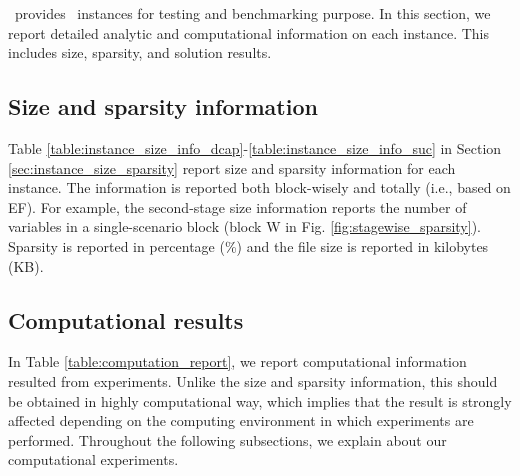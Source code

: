 %
%

\siplibtwo\ provides \smps\ instances for testing and benchmarking purpose. In this section, we report detailed analytic and computational information on each instance. This includes size, sparsity, and solution results.

\subsection{Size and sparsity information}
Table \ref{table:instance_size_info_dcap}-\ref{table:instance_size_info_suc} in Section \ref{sec:instance_size_sparsity} report size and sparsity information for each instance. The information is reported both block-wisely and totally (i.e., based on EF). For example, the second-stage size information reports the number of variables in a single-scenario block (block W in Fig. \ref{fig:stagewise_sparsity}). Sparsity is reported in percentage (\%) and the file size is reported in kilobytes (KB).

\subsection{Computational results}
In Table \ref{table:computation_report}, we report computational information resulted from experiments. Unlike the size and sparsity information, this should be obtained in highly computational way, which implies that the result is strongly affected depending on the computing environment in which experiments are performed. Throughout the following subsections, we explain about our computational experiments.

